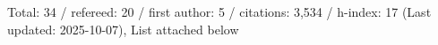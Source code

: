 Total: 34 / refereed: 20 / first author: 5 / citations: 3,534 / h-index: 17 (Last updated: 2025-10-07), List attached below